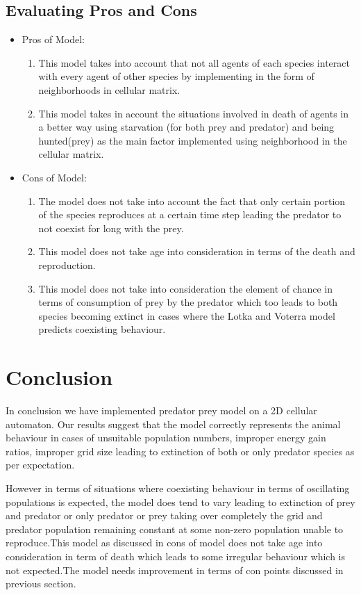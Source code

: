 \documentclass[prl,12pt,citeautoscript,reprint]{revtex4-1}
\begin{document}
\subsection{Evaluating Pros and Cons}
\begin{itemize}
\item Pros of Model:
\begin{enumerate}
\item This model takes into account that not all agents of each species interact with every agent of other species by implementing in the form of neighborhoods in cellular matrix.
\item This model takes in account the situations involved in death of agents in a better way using starvation
(for both prey and predator) and being hunted(prey) as the main factor implemented using neighborhood in the cellular matrix.
\end{enumerate}

\item Cons of Model:
\begin{enumerate}
\item The model does not take into account the fact that only certain portion of the species reproduces at a certain time step leading the predator to not coexist for long with the prey.
\item This model does not take age into consideration in terms of the death and reproduction.
\item This model does not take into consideration the element of chance in terms of consumption of prey by the predator which too leads to both species becoming extinct in cases where the Lotka and Voterra model predicts coexisting behaviour.
\end{enumerate}
\end{itemize}
\section{Conclusion}
In conclusion we have implemented predator prey model on a 2D cellular automaton. Our results suggest that the model correctly represents the animal behaviour in cases of unsuitable population numbers,  improper energy gain ratios, improper grid size leading to extinction of both or only predator species as per expectation.

However in terms of situations where coexisting behaviour in terms of oscillating populations is expected, the model does tend to vary leading to extinction of prey and predator or only predator or prey taking over completely the grid and predator population remaining constant at some non-zero population unable to reproduce.This model as discussed in cons of model does not take age into consideration in term of death which leads to some irregular behaviour which is not expected.The model needs improvement in terms of con points discussed in previous section.
\end{document}
